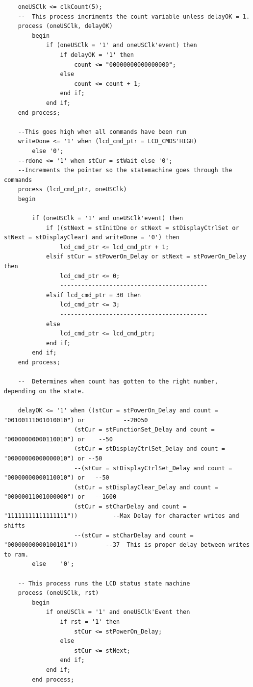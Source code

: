 \documentclass[a4paper,12pt,twoside]{article}
\begin{document}
\begin{lstlisting}
    oneUSClk <= clkCount(5);
	--  This process incriments the count variable unless delayOK = 1.
    process (oneUSClk, delayOK)
        begin
            if (oneUSClk = '1' and oneUSClk'event) then
                if delayOK = '1' then
                    count <= "00000000000000000";
                else
                    count <= count + 1;
                end if;
            end if;
    end process;

    --This goes high when all commands have been run
    writeDone <= '1' when (lcd_cmd_ptr = LCD_CMDS'HIGH) 
        else '0';
	--rdone <= '1' when stCur = stWait else '0';
	--Increments the pointer so the statemachine goes through the commands
    process (lcd_cmd_ptr, oneUSClk)
    begin
	
        if (oneUSClk = '1' and oneUSClk'event) then
            if ((stNext = stInitDne or stNext = stDisplayCtrlSet or stNext = stDisplayClear) and writeDone = '0') then 
                lcd_cmd_ptr <= lcd_cmd_ptr + 1;
            elsif stCur = stPowerOn_Delay or stNext = stPowerOn_Delay then
                lcd_cmd_ptr <= 0;
                ------------------------------------------	
            elsif lcd_cmd_ptr = 30 then
                lcd_cmd_ptr <= 3;
                ------------------------------------------
            else
                lcd_cmd_ptr <= lcd_cmd_ptr;
            end if;
        end if;
    end process;
	
	--  Determines when count has gotten to the right number, depending on the state.

    delayOK <= '1' when ((stCur = stPowerOn_Delay and count = "00100111001010010") or 			--20050  
                    (stCur = stFunctionSet_Delay and count = "00000000000110010") or	--50
                    (stCur = stDisplayCtrlSet_Delay and count = "00000000000000010") or	--50
                    --(stCur = stDisplayCtrlSet_Delay and count = "00000000000110010") or	--50
                    (stCur = stDisplayClear_Delay and count = "00000011001000000") or	--1600
                    (stCur = stCharDelay and count = "11111111111111111"))			--Max Delay for character writes and shifts
                    --(stCur = stCharDelay and count = "00000000000100101"))		--37  This is proper delay between writes to ram.
		else	'0';
  	
	-- This process runs the LCD status state machine
	process (oneUSClk, rst)
		begin
			if oneUSClk = '1' and oneUSClk'Event then
				if rst = '1' then
					stCur <= stPowerOn_Delay;
				else
					stCur <= stNext;
				end if;
			end if;
		end process;


\end{lstlisting}
\end{document}
